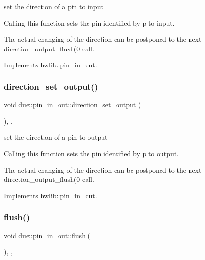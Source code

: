 set the direction of a pin to input

Calling this function sets the pin identified by p to input.

The actual changing of the direction can be postponed to the next direction\+\_\+output\+\_\+flush(0 call. 

Implements \hyperlink{classhwlib_1_1pin__in__out_a54ce1a5086d3c9e7b868511b1d46acd0}{hwlib\+::pin\+\_\+in\+\_\+out}.

\mbox{\label{classdue_1_1pin__in__out_a45f7cf2e7f71638337f82ecf1852f884}} 
\subsubsection{\texorpdfstring{direction\+\_\+set\+\_\+output()}{direction\_set\_output()}}
{\footnotesize\ttfamily void due\+::pin\+\_\+in\+\_\+out\+::direction\+\_\+set\+\_\+output (\begin{DoxyParamCaption}{ }\end{DoxyParamCaption})\hspace{0.3cm}{\ttfamily [inline]}, {\ttfamily [override]}, {\ttfamily [virtual]}}

set the direction of a pin to output

Calling this function sets the pin identified by p to output.

The actual changing of the direction can be postponed to the next direction\+\_\+output\+\_\+flush(0 call. 

Implements \hyperlink{classhwlib_1_1pin__in__out_ad08a5f5e9a4c3aadaa7c665b98f2418e}{hwlib\+::pin\+\_\+in\+\_\+out}.

\mbox{\label{classdue_1_1pin__in__out_af138c21a34306d3421e0b961bf9406a1}} 
\subsubsection{\texorpdfstring{flush()}{flush()}}
{\footnotesize\ttfamily void due\+::pin\+\_\+in\+\_\+out\+::flush (\begin{DoxyParamCaption}{ }\end{DoxyParamCaption})\hspace{0.3cm}{\ttfamily [inline]}, {\ttfamily [override]}, {\ttfamily [virtual]}}

